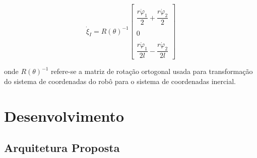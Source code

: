 \documentclass[a4paper]{ifacconf}
\begin{document}
\begin{equation}
\dot{\xi}_{I}=R(\theta)^{-1}
\begin{bmatrix}
\\ \dfrac{r\dot{\varphi}_{1}}{2}+\dfrac{r\dot{\varphi}_{2}}{2}\\
\\0 \\
\\ \dfrac{r\dot{\varphi}_{1}}{2l}-\dfrac{r\dot{\varphi}_{2}}{2l}
\end{bmatrix}
\end{equation}

onde $R(\theta)^{-1}$ refere-se a matriz de rotação ortogonal usada para transformação do sistema de coordenadas do robô para o sistema de coordenadas inercial. 

\section{Desenvolvimento}

\subsection{Arquitetura Proposta}




\end{document}
